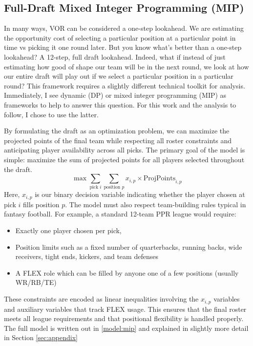 \documentclass{article}
\begin{document}
\subsection{Full-Draft Mixed Integer Programming (MIP)}
In many ways, VOR can be considered a one-step lookahead.
We are estimating the opportunity cost of selecting a particular position at a particular point in time vs picking it one round later.
But you know what's better than a one-step lookahead? A 12-step, full draft lookahead.
Indeed, what if instead of just estimating how good of shape our team will be in the next round, we look at how our entire draft will play out if we select a particular position in a particular round?
This framework requires a slightly different technical toolkit for analysis.
Immediately, I see dynamic (DP) or mixed integer programming (MIP) as frameworks to help to answer this question.
For this work and the analysis to follow, I chose to use the latter.

By formulating the draft as an optimization problem, we can maximize the projected points of the final team while respecting all roster constraints and anticipating player availability across all picks.
The primary goal of the model is simple: maximize the sum of projected points for all players selected throughout the draft.
\[
\max \sum_{\text{pick } i} \sum_{\text{position } p} x_{i,p} \times \text{ProjPoints}_{i,p}
\]
Here, \(x_{i,p}\) is our binary decision variable indicating whether the player chosen at pick \(i\) fills position \(p\).
The model must also respect team-building rules typical in fantasy football. For example, a standard 12-team PPR league would require:
\begin{itemize}
  \item Exactly one player chosen per pick,
  \item Position limits such as a fixed number of quarterbacks, running backs, wide receivers, tight ends, kickers, and team defenses
  \item A FLEX role which can be filled by anyone one of a few positions (usually WR/RB/TE)
\end{itemize}
These constraints are encoded as linear inequalities involving the \(x_{i,p}\) variables and auxiliary variables that track FLEX usage.
This ensures that the final roster meets all league requirements and that positional flexibility is handled properly.
The full model is written out in \eqref{model:mip} and explained in slightly more detail in Section \ref{sec:appendix}
\end{document}
